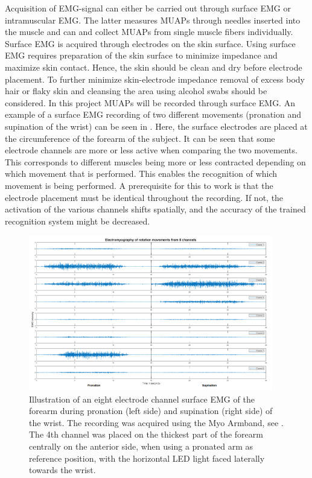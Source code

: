 Acquisition of EMG-signal can either be carried out through surface EMG or intramuscular EMG. The latter measures MUAPs through needles inserted into the muscle and can and collect MUAPs from single muscle fibers individually. Surface EMG is acquired through electrodes on the skin surface. \cite{Cram2012}  Using surface EMG requires preparation of the skin surface to minimize impedance and maximize skin contact. Hence, the skin should be clean and dry before electrode placement. To further minimize skin-electrode impedance removal of excess body hair or flaky skin and cleansing the area using alcohol swabs should be considered. \cite{Turker2013,Cram2012} In this project MUAPs will be recorded through surface EMG. An example of a surface EMG recording of two different movements (pronation and supination of the wrist) can be seen in . Here, the surface electrodes are placed at the circumference of the forearm of the subject. It can be seen that some electrode channels are more or less active when comparing the two movements. This corresponds to different muscles being more or less contracted depending on which movement that is performed. This enables the recognition of which movement is being performed. A prerequisite for this to work is that the electrode placement must be identical throughout the recording. If not, the activation of the various channels shifts spatially, and the accuracy of the trained recognition system might be decreased.

\begin{figure}[H]                 
	\includegraphics[width=0.95\textwidth]{figures/Emg_rot}  
	\caption{Illustration of an eight electrode channel surface EMG of the forearm during pronation (left side) and supination (right side) of the wrist. The recording was acquired using the Myo Armband, see . The 4th channel was placed on the thickest part of the forearm centrally on the anterior side, when using a pronated arm as reference position, with the horizontal LED light faced laterally towards the wrist.}
	\label{fig:Emg_rot} 
\end{figure}

